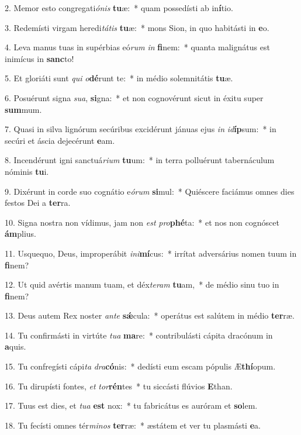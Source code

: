 2. Memor esto congregati\textit{ó}\textit{nis} \textbf{tu}æ:~*  quam possedísti ab in\textbf{í}tio.\

3. Redemísti virgam heredi\textit{tá}\textit{tis} \textbf{tu}æ:~*  mons Sion, in quo habitásti in \textbf{e}o.\

4. Leva manus tuas in supérbias eó\textit{rum} \textit{in} \textbf{fi}nem:~*  quanta malignátus est inimícus in \textbf{sanc}to!\

5. Et gloriáti sunt \textit{qui} \textit{o}\textbf{dé}runt te:~*  in médio solemnitátis \textbf{tu}æ.\

6. Posuérunt signa \textit{su}\textit{a}, \textbf{si}gna:~*  et non cognovérunt sicut in éxitu super \textbf{sum}mum.\

7. Quasi in silva lignórum secúribus excidérunt jánuas ejus \textit{in} \textit{id}\textbf{íp}sum:~*  in secúri et áscia dejecérunt \textbf{e}am.\

8. Incendérunt igni sanctuá\textit{ri}\textit{um} \textbf{tu}um:~*  in terra polluérunt tabernáculum nóminis \textbf{tu}i.\

9. Dixérunt in corde suo cognátio e\textit{ó}\textit{rum} \textbf{si}mul:~*  Quiéscere faciámus omnes dies festos Dei a \textbf{ter}ra.\

10. Signa nostra non vídimus, jam non \textit{est} \textit{pro}\textbf{phé}ta:~*  et nos non cognóscet \textbf{ám}plius.\

11. Usquequo, Deus, improperábit \textit{in}\textit{i}\textbf{mí}cus:~*  irrítat adversárius nomen tuum in \textbf{fi}nem?\

12. Ut quid avértis manum tuam, et déx\textit{te}\textit{ram} \textbf{tu}am,~*  de médio sinu tuo in \textbf{fi}nem?\

13. Deus autem Rex noster \textit{an}\textit{te} \textbf{sǽ}cula:~*  operátus est salútem in médio \textbf{ter}ræ.\

14. Tu confirmásti in virtúte \textit{tu}\textit{a} \textbf{ma}re:~*  contribulásti cápita dracónum in \textbf{a}quis.\

15. Tu confregísti cápi\textit{ta} \textit{dra}\textbf{có}nis:~*  dedísti eum escam pópulis Æ\textbf{thí}opum.\

16. Tu dirupísti fontes, \textit{et} \textit{tor}\textbf{rén}tes~*  tu siccásti flúvios \textbf{E}than.\

17. Tuus est dies, et \textit{tu}\textit{a} \textbf{est} nox:~*  tu fabricátus es auróram et \textbf{so}lem.\

18. Tu fecísti omnes tér\textit{mi}\textit{nos} \textbf{ter}ræ:~*  æstátem et ver tu plasmásti \textbf{e}a.\

